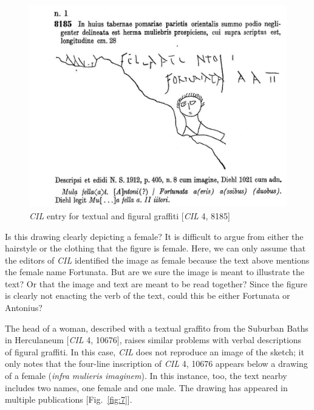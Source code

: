\documentclass[amsthm,ebook]{saparticle}
\begin{document}
\begin{figure}[!bp]
\centering
 \includegraphics[width=\columnwidth]{EAGLE2016BenefielSypniewski-img006.jpg}
\caption{\emph{CIL} entry for textual and figural graffiti [\emph{CIL} 4, 8185]}
\label{fig:6}
\end{figure}




Is this drawing clearly depicting a female? It is difficult to argue from either the hairstyle or the clothing that the
figure is female. Here, we can only assume that the editors of \emph{CIL} identified the image as female because the text
above mentions the female name Fortunata. But are we sure the image is meant to illustrate the text? Or that the image
and text are meant to be read together? Since the figure is clearly not enacting the verb of the text, could this be
either Fortunata or Antonius?

The head of a woman, described with a textual graffito from the Suburban Baths in Herculaneum [\emph{CIL} 4, 10676], raises
similar problems with verbal descriptions of figural graffiti. In this case, \emph{CIL} does not reproduce an image of the
sketch; it only notes that the four-line inscription of \emph{CIL} 4, 10676 appears below a drawing of a female (\emph{infra
mulieris imaginem}). In this instance, too, the text nearby includes two names, one female and one male. The drawing has
appeared in multiple publications \citep{della_corte_loves_1960,deiss_herculaneum_1989,vivolo_pompei:_1993} [Fig.~\ref{fig:7}]. 
\end{document}
